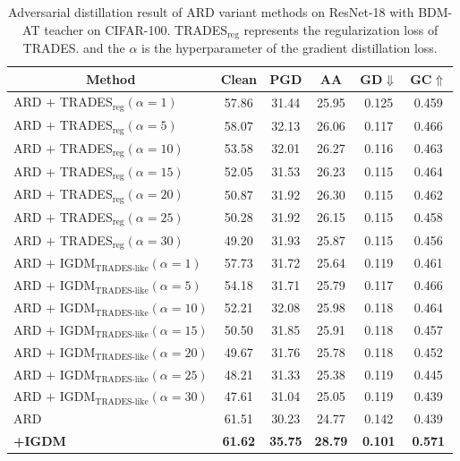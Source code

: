 \documentclass{article} %
\begin{document}
\begin{table}[h]
 \centering
 \caption{Adversarial distillation result of ARD variant methods on ResNet-18 with BDM-AT teacher on CIFAR-100. TRADES$_\text{reg}$ represents the regularization loss of TRADES. and the $\alpha$ is the hyperparameter of the gradient distillation loss.}
 \setlength{\tabcolsep}{12.3pt}
 \begin{tabular}{lccccc}
 \toprule

 \multicolumn{1}{c}{Method}  & Clean & PGD & AA & GD$\Downarrow$ & GC$\Uparrow$ \\
\midrule

ARD $+$ TRADES$_{\text{reg}} (\alpha = 1)$  & 57.86 & 31.44 & 25.95 & 0.125 & 0.459\\
ARD $+$ TRADES$_{\text{reg}} (\alpha = 5)$  & 58.07 & 32.13 & 26.06 & 0.117 & 0.466\\
ARD $+$ TRADES$_{\text{reg}} (\alpha = 10)$  & 53.58 & 32.01 & 26.27 & 0.116 & 0.463\\
ARD $+$ TRADES$_{\text{reg}} (\alpha = 15)$  & 52.05 & 31.53 & 26.23 & 0.115 & 0.464\\
ARD $+$ TRADES$_{\text{reg}} (\alpha = 20)$  & 50.87 & 31.92 & 26.30 & 0.115 & 0.462\\
ARD $+$ TRADES$_{\text{reg}} (\alpha = 25)$  & 50.28 & 31.92 & 26.15 & 0.115 & 0.458\\
ARD $+$ TRADES$_{\text{reg}} (\alpha = 30)$  & 49.20 & 31.93 & 25.87 & 0.115 & 0.456\\
\midrule
ARD $+$ IGDM$_\text{TRADES-like} (\alpha = 1)$  & 57.73 & 31.72 & 25.64 & 0.119 & 0.461\\
ARD $+$ IGDM$_\text{TRADES-like} (\alpha = 5)$  & 54.18 & 31.71 & 25.79 & 0.117& 0.466\\
ARD $+$ IGDM$_\text{TRADES-like} (\alpha = 10)$  & 52.21 & 32.08 & 25.98 & 0.118& 0.464\\
ARD $+$ IGDM$_\text{TRADES-like} (\alpha = 15)$  & 50.50 & 31.85 & 25.91 & 0.118& 0.457\\
ARD $+$ IGDM$_\text{TRADES-like} (\alpha = 20)$  & 49.67 & 31.76 & 25.78 & 0.118& 0.452\\
ARD $+$ IGDM$_\text{TRADES-like} (\alpha = 25)$  & 48.21 & 31.33 & 25.38 & 0.119& 0.445\\
ARD $+$ IGDM$_\text{TRADES-like} (\alpha = 30)$  & 47.61 & 31.04 & 25.05 & 0.119& 0.439\\
\midrule
 ARD \citep{ard} & 61.51 & 30.23 & 24.77 & 0.142& 0.439\\
 \textbf{+IGDM} & \textbf{61.62} & \textbf{35.75} & \textbf{28.79} & \textbf{0.101}& \textbf{0.571}\\

\bottomrule
 \end{tabular}

 \label{tab:supp_logit_diff}
\end{table}
\end{document}
